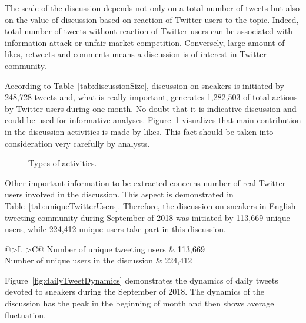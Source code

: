 The scale of the discussion depends not only on a total number of tweets but also on the value of discussion based on reaction of Twitter users to the topic. Indeed, total number of tweets without reaction of Twitter users can be associated with information attack or unfair market competition. Conversely, large amount of likes, retweets and comments means a discussion is of interest in Twitter community.

According to Table~\cref{tab:discussionSize}, discussion on sneakers is initiated by 248,728 tweets and, what is really important, generates 1,282,503 of total actions by Twitter users during one month. No doubt that it is indicative discussion and could be used for informative analyses. Figure~\cref{fig:activityTypes} visualizes that main contribution in the discussion activities is made by likes. This fact should be taken into consideration very carefully by analysts.

\begin{figure}[ht]
	\caption{Types of activities.}\label{fig:activityTypes}
\end{figure}

Other important information to be extracted concerns number of real Twitter users involved in the discussion. This aspect is demonstrated in Table~\cref{tab:uniqueTwitterUsers}. Therefore, the discussion on sneakers in English-tweeting community during September of 2018 was initiated by 113,669 unique users, while 224,412 unique users take part in this discussion.

\begin{table} [htbp]%
	\centering
	\caption{Unique Twitter users.}%
	\label{tab:uniqueTwitterUsers}%
	\renewcommand{\arraystretch}{1.6}%
	\begin{tabulary}{\textwidth}{@{}>{\zz}L >{\zz}C@{}}%
		\toprule     %
		Number of unique tweeting users & 113,669 \\ 
		Number of unique users in the discussion & 224,412  \\
		\bottomrule %
	\end{tabulary}%
\end{table}

Figure~\cref{fig:dailyTweetDynamics} demonstrates the dynamics of daily tweets devoted to sneakers during the September of 2018. The dynamics of the discussion has the peak in the beginning of month and then shows average fluctuation.

